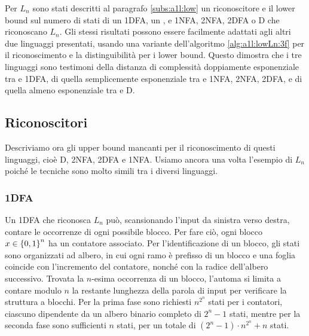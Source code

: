 Per $L_n$ sono stati descritti al paragrafo \ref{subs:a1l:low} un  riconoscitore e il lower bound sul numero di stati di un 1DFA, un , e 1NFA, 2NFA, 2DFA o D che riconoscano $L_n$. Gli stessi risultati possono essere facilmente adattati agli altri due linguaggi presentati, usando una variante dell'algoritmo \ref{alg:a1l:lowLn:3f} per il riconoscimento e la distinguibilità per i lower bound. Questo dimostra che i tre linguaggi sono testimoni della distanza di complessità doppiamente esponenziale tra  e 1DFA, di quella semplicemente esponenziale tra  e 1NFA, 2NFA, 2DFA, e di quella almeno esponenziale tra  e D.


\subsection{Riconoscitori}
Descriviamo ora gli upper bound mancanti per il riconoscimento di questi linguaggi, cioè D, 2NFA, 2DFA e 1NFA. Usiamo ancora una volta l'esempio di $L_n$ poiché le tecniche sono molto simili tra i diversi linguaggi.

\subsubsection{1DFA}
Un 1DFA che riconosca $L_n$ può, scansionando l'input da sinistra verso destra, contare le occorrenze di ogni possibile blocco. Per fare ciò, ogni blocco $x\in\left\{ 0,1 \right\}^n$ ha un contatore associato. Per l'identificazione di un blocco, gli stati sono organizzati ad albero, in cui ogni ramo è prefisso di un blocco e una foglia coincide con l'incremento del contatore, nonché con la radice dell'albero successivo. Trovata la $n$-esima occorrenza di un blocco, l'automa si limita a contare modulo $n$ la restante lunghezza della parola di input per verificare la struttura a blocchi. Per la prima fase sono richiesti $n^{2^n}$ stati per i contatori, ciascuno dipendente da un albero binario completo di $2^n-1$ stati, mentre per la seconda fase sono sufficienti $n$ stati, per un totale di $(2^n-1)\cdot n^{2^n}+n$ stati.

